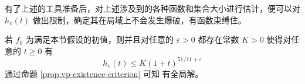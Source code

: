 
有了上述的工具准备后，对上述涉及到的各种函数和集合大小进行估计，便可以对 $h_{v}(t)$ 做出限制，确定其在局域上不会发生爆破，有函数束缚住。
\begin{theorem}
  若 $f_0$ 为满足本节假设的初值，则并且对任意的 $\varepsilon>0$ 都存在常数 $K>0$ 使得对任意的 $t \geqslant 0$ 有
  \[
  h_{v}(t) \leqslant K (1+t)^{51 / 11+\varepsilon}
  \]
  通过命题 \ref{prop:vp-existence-criterion} 可知 \eqvp 有全局解。
\end{theorem}


